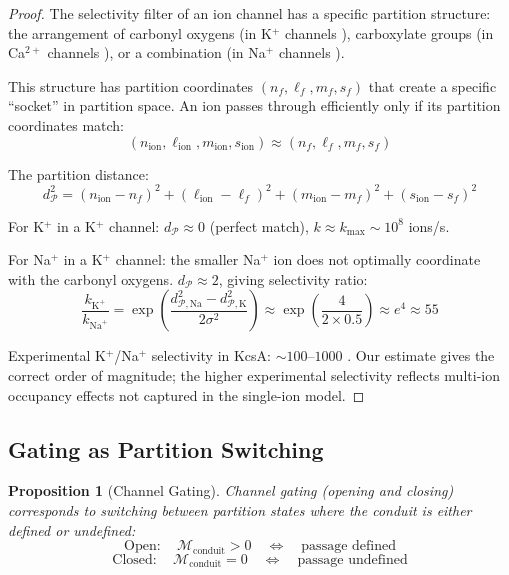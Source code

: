 \documentclass[twocolumn,10pt]{article}
\newtheorem{proposition}[theorem]{Proposition}
\theoremstyle{remark}
\newcommand{\Depth}{\mathcal{M}}
\newcommand{\Partition}{\mathcal{P}}
\begin{document}
\begin{proof}
The selectivity filter of an ion channel has a specific partition structure: the arrangement of carbonyl oxygens (in K$^+$ channels \cite{doyle1998}), carboxylate groups (in Ca$^{2+}$ channels \cite{sather2003}), or a combination (in Na$^+$ channels \cite{payandeh2011}).

This structure has partition coordinates $(n_f, \ell_f, m_f, s_f)$ that create a specific ``socket'' in partition space. An ion passes through efficiently only if its partition coordinates match:
\begin{equation}
    (n_{\text{ion}}, \ell_{\text{ion}}, m_{\text{ion}}, s_{\text{ion}}) \approx (n_f, \ell_f, m_f, s_f)
\end{equation}

The partition distance:
\begin{equation}
    d_{\Partition}^2 = (n_{\text{ion}} - n_f)^2 + (\ell_{\text{ion}} - \ell_f)^2 + (m_{\text{ion}} - m_f)^2 + (s_{\text{ion}} - s_f)^2
\end{equation}

For K$^+$ in a K$^+$ channel: $d_{\Partition} \approx 0$ (perfect match), $k \approx k_{\max} \sim 10^8$ ions/s.

For Na$^+$ in a K$^+$ channel: the smaller Na$^+$ ion does not optimally coordinate with the carbonyl oxygens. $d_{\Partition} \approx 2$, giving selectivity ratio:
\begin{equation}
    \frac{k_{\text{K}^+}}{k_{\text{Na}^+}} = \exp\left(\frac{d_{\Partition,\text{Na}}^2 - d_{\Partition,\text{K}}^2}{2\sigma^2}\right) \approx \exp\left(\frac{4}{2 \times 0.5}\right) \approx e^4 \approx 55
\end{equation}

Experimental K$^+$/Na$^+$ selectivity in KcsA: $\sim 100$--$1000$ \cite{doyle1998}. Our estimate gives the correct order of magnitude; the higher experimental selectivity reflects multi-ion occupancy effects not captured in the single-ion model.
\end{proof}

\subsection{Gating as Partition Switching}

\begin{proposition}[Channel Gating]
\label{prop:gating}
Channel gating (opening and closing) corresponds to switching between partition states where the conduit is either defined or undefined:
\begin{equation}
    \text{Open}: \quad \Depth_{\text{conduit}} > 0 \quad \Leftrightarrow \quad \text{passage defined}
\end{equation}
\begin{equation}
    \text{Closed}: \quad \Depth_{\text{conduit}} = 0 \quad \Leftrightarrow \quad \text{passage undefined}
\end{equation}
\end{proposition}
\end{document}
